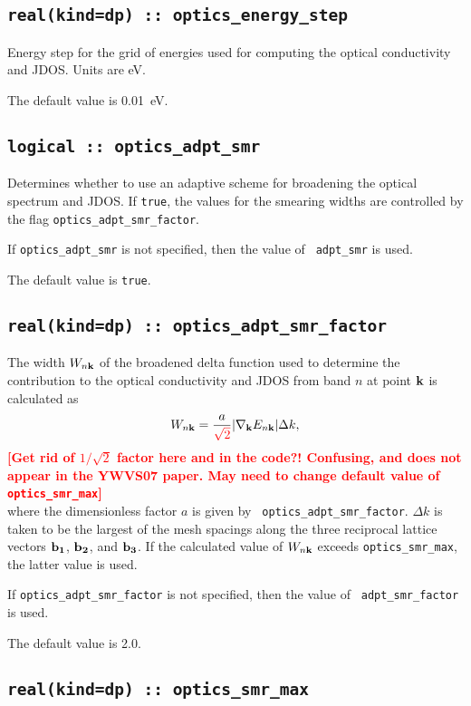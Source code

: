 \subsection[optics\_energy\_step]{\tt real(kind=dp) :: optics\_energy\_step}
Energy step for the grid of energies used for computing the optical
conductivity and JDOS. Units are eV.

The default value is 0.01~eV.


\subsection[optics\_adpt\_smr]{\tt logical :: optics\_adpt\_smr}
Determines whether to use an adaptive scheme for broadening the
optical spectrum and JDOS. If \verb#true#, the values for the smearing widths are 
controlled by the flag {\tt optics\_adpt\_smr\_factor}.

If {\tt optics\_adpt\_smr} is not specified, then the value of {\tt
  adpt\_smr} is used.  

The default value is \verb#true#.


\subsection[optics\_adpt\_smr\_factor]{\tt real(kind=dp) ::
  optics\_adpt\_smr\_factor}

The width $W_{n{\bf k}}$ of the broadened delta function used to
determine the contribution to the optical conductivity and JDOS from
band $n$ at point ${\bf k}$ is calculated as
%
$$
W_{n{\bf k}}=\frac{a}{\textcolor{red}{\sqrt{2}}}\vert
\nabla_{\bf k} E_{n{\bf k}}\vert \Delta k,
$$ 
%
\textcolor{red}{{\bf [Get rid of $1/\sqrt{2}$ factor here and in the code?! 
Confusing, and does not appear in the YWVS07 paper. May need to change default value of
{\tt optics\_smr\_max}]}}\\
where the dimensionless factor $a$ is given by {\tt
  optics\_adpt\_smr\_factor}. $\Delta k$ is taken to be the largest of
the mesh spacings along the three reciprocal lattice vectors ${\bf
  b_1}$, ${\bf b_2}$, and ${\bf b_3}$.  If the calculated value of
$W_{n{\bf k}}$ exceeds {\tt optics\_smr\_max}, the latter
value is used.

If {\tt optics\_adpt\_smr\_factor} is not specified, then the value of {\tt
  adpt\_smr\_factor} is used.  

The default value is 2.0.


\subsection[optics\_smr\_max]{\tt real(kind=dp) ::
  optics\_smr\_max}

